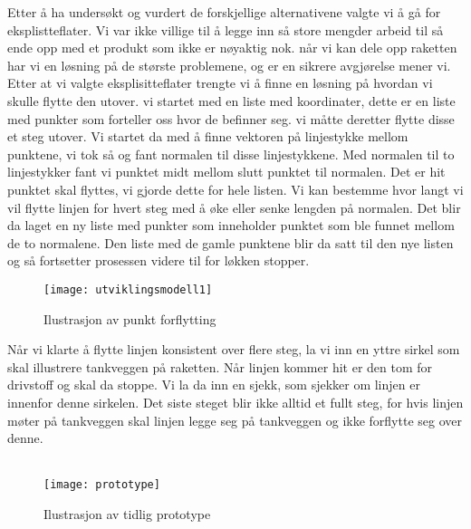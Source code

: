 Etter å ha undersøkt og vurdert de forskjellige alternativene valgte vi å gå for eksplistteflater. Vi var ikke villige til å legge inn så store mengder arbeid til så ende opp med et produkt som ikke er nøyaktig nok. når vi kan dele opp raketten har vi en løsning på de største problemene, og er en sikrere avgjørelse mener vi. 
\clearpage 
Etter at vi valgte eksplisitteflater trengte vi å finne en løsning på hvordan vi skulle flytte den utover. vi startet med en liste med koordinater, dette er en liste med punkter som forteller oss hvor de befinner seg. vi måtte deretter flytte disse et steg utover. Vi startet da med å finne vektoren på linjestykke mellom punktene, vi tok så og fant normalen til disse linjestykkene. Med normalen til to linjestykker fant vi punktet midt mellom slutt punktet til normalen. Det er hit punktet skal flyttes, vi gjorde dette for hele listen. Vi kan bestemme hvor langt vi vil flytte linjen for hvert steg med å øke eller senke lengden på normalen. Det blir da laget en ny liste med punkter som inneholder punktet som ble funnet mellom de to normalene. Den liste med de gamle punktene blir da satt til den nye listen og så fortsetter prosessen videre til for løkken stopper.\\
\begin{figure}[h]
    \centering
    \texttt{[image: utviklingsmodell1]}
    \caption{Ilustrasjon av punkt forflytting}
    \label{fig:my_label}
\end{figure}
Når vi klarte å flytte linjen konsistent over flere steg, la vi inn en yttre sirkel som skal illustrere tankveggen på raketten. Når linjen kommer hit er den tom for drivstoff og skal da stoppe. Vi la da inn en sjekk, som sjekker om linjen er innenfor denne sirkelen. Det siste steget blir ikke alltid et fullt steg, for hvis linjen møter på tankveggen skal linjen legge seg på tankveggen og ikke forflytte seg over denne. \\ \\
\begin{figure}[H]
    \centering
    \texttt{[image: prototype]}
    \caption{Ilustrasjon av tidlig prototype}
    \label{fig:my_label}
\end{figure}


\clearpage
